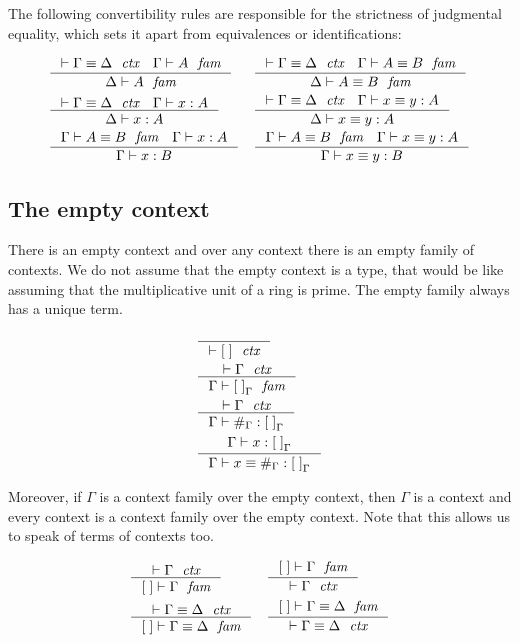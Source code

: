 The following convertibility rules are responsible for the strictness
of judgmental equality, which sets it apart from equivalences or identifications:

\begin{align*}
& \inference
  { \jctxeq{\Gamma}{\Delta}
    \jfam{\Gamma}{A}
    }
  { \jfam{\Delta}{A}
    }
& & \inference
    { \jctxeq{\Gamma}{\Delta}
      \jfameq{\Gamma}{A}{B}
      }
    { \jfameq{\Delta}{A}{B}
      }
    \\
& \inference
  { \jctxeq{\Gamma}{\Delta}
    \jterm{\Gamma}{A}{x}
    }
  { \jterm{\Delta}{A}{x}
    }
& & \inference
    { \jctxeq{\Gamma}{\Delta}
      \jtermeq{\Gamma}{A}{x}{y}
      }
    { \jtermeq{\Delta}{A}{x}{y}
      }
    \\
& \inference
  { \jfameq{\Gamma}{A}{B}
    \jterm{\Gamma}{A}{x}
    }
  { \jterm{\Gamma}{B}{x}
    }
& & \inference
    { \jfameq{\Gamma}{A}{B}
      \jtermeq{\Gamma}{A}{x}{y}
      }
    { \jtermeq{\Gamma}{B}{x}{y}
      }
\end{align*}

\subsection{The empty context}
There is an empty context and over any context there is an empty family of
contexts. We do not assume that the empty context is a type, that would be like
assuming that the multiplicative unit of a ring is prime. The empty family
always has a unique term. 

\begin{align}
& \inference
  { }
  { \jctx{\emptyc}
    }
  \\
& \inference
  { \jctx{\Gamma}
    }
  { \jfam{\Gamma}{\emptyf[\Gamma]}
    }
  \\
& \inference
  { \jctx{\Gamma}
    }
  { \jterm{\Gamma}{\emptyf[\Gamma]}{\emptytm[\Gamma]}
    }
  \\
& \inference
  { \jterm{\Gamma}{\emptyf[\Gamma]}{x}
    }
  { \jtermeq
      {\Gamma}
      {\emptyf[\Gamma]}
      {x}
      {\emptytm[\Gamma]}
    }
\end{align}

Moreover, if $\Gamma$ is a context family over the
empty context, then $\Gamma$ is a context and every context is a context
family over the empty context. Note that this allows us to speak
of terms of contexts too.

\begin{align}
& \inference
  { \jctx{\Gamma}
    }
  { \jfam{\emptyc}{\Gamma}
    } 
& & \inference
    { \jfam{\emptyc}{\Gamma}
      }
    { \jctx{\Gamma}
      }
    \\
& \inference
  { \jctxeq{\Gamma}{\Delta}
    }
  { \jfameq{\emptyc}{\Gamma}{\Delta}
    }
& & \inference
    { \jfameq{\emptyc}{\Gamma}{\Delta}
      }
    { \jctxeq{\Gamma}{\Delta}
      }
\end{align}

